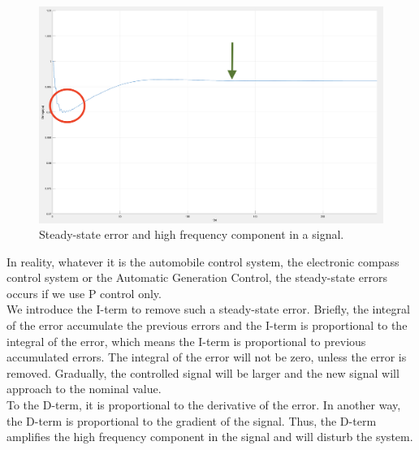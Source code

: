 \begin{figure}[htbp]
\centering
\includegraphics[width = .891\textwidth]{figure/3_2_steady.png}
\caption{Steady-state error and high frequency component in a signal.}
\label{3_2_steady}
\end{figure}

In reality, whatever it is the automobile control system, the electronic compass control system or the Automatic Generation Control, the steady-state errors occurs if we use P control only.\\

We introduce the I-term to remove such a steady-state error. Briefly, the integral of the error accumulate the previous errors and the I-term is proportional to the integral of the error, which means the I-term is proportional to previous accumulated errors. The integral of the error will not be zero, unless the error is removed. Gradually, the controlled signal will be larger and the new signal will approach to the nominal value.\\

To the D-term, it is proportional to the derivative of the error. In another way, the D-term is proportional to the gradient of the signal. Thus, the D-term amplifies the high frequency component in the signal and will disturb the system.\\